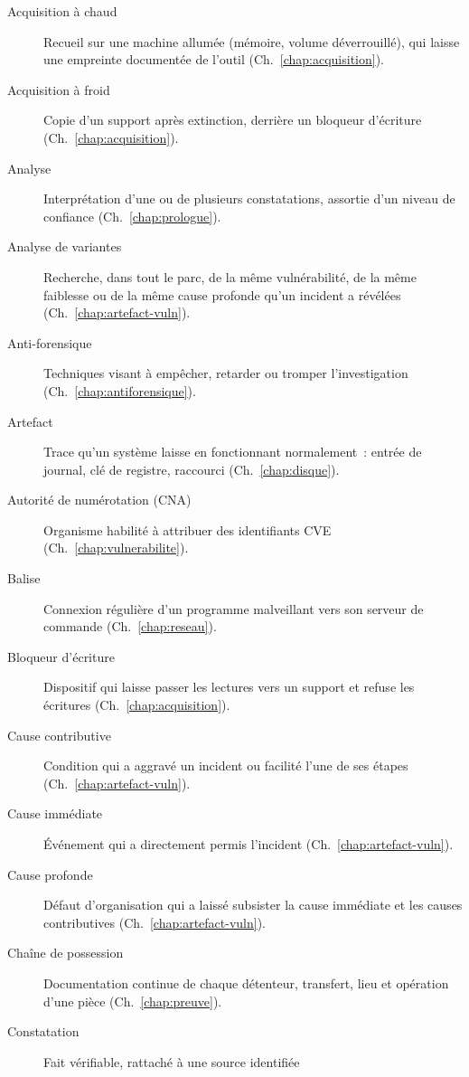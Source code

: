\begin{description}
    \item[Acquisition à chaud] Recueil sur une machine allumée (mémoire,
          volume déverrouillé), qui laisse une empreinte documentée de
          l'outil (Ch.~\ref{chap:acquisition}).
    \item[Acquisition à froid] Copie d'un support après extinction, derrière
          un bloqueur d'écriture (Ch.~\ref{chap:acquisition}).
    \item[Analyse] Interprétation d'une ou de plusieurs constatations,
          assortie d'un niveau de confiance (Ch.~\ref{chap:prologue}).
    \item[Analyse de variantes] Recherche, dans tout le parc, de la même
          vulnérabilité, de la même faiblesse ou de la même cause profonde
          qu'un incident a révélées (Ch.~\ref{chap:artefact-vuln}).
    \item[Anti-forensique] Techniques visant à empêcher, retarder ou tromper
          l'investigation (Ch.~\ref{chap:antiforensique}).
    \item[Artefact] Trace qu'un système laisse en fonctionnant normalement~:
          entrée de journal, clé de registre, raccourci (Ch.~\ref{chap:disque}).
    \item[Autorité de numérotation (CNA)] Organisme habilité à attribuer des
          identifiants CVE (Ch.~\ref{chap:vulnerabilite}).
    \item[Balise] Connexion régulière d'un programme malveillant vers son
          serveur de commande (Ch.~\ref{chap:reseau}).
    \item[Bloqueur d'écriture] Dispositif qui laisse passer les lectures
          vers un support et refuse les écritures (Ch.~\ref{chap:acquisition}).
    \item[Cause contributive] Condition qui a aggravé un incident ou facilité
          l'une de ses étapes (Ch.~\ref{chap:artefact-vuln}).
    \item[Cause immédiate] Événement qui a directement permis l'incident
          (Ch.~\ref{chap:artefact-vuln}).
    \item[Cause profonde] Défaut d'organisation qui a laissé subsister la
          cause immédiate et les causes contributives
          (Ch.~\ref{chap:artefact-vuln}).
    \item[Chaîne de possession] Documentation continue de chaque détenteur,
          transfert, lieu et opération d'une pièce (Ch.~\ref{chap:preuve}).
    \item[Constatation] Fait vérifiable, rattaché à une source identifiée

\end{description}
